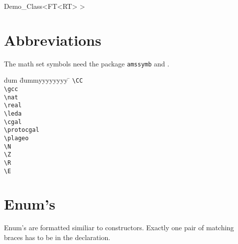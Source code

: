 \documentclass[12pt]{article}
\begin{document}
{\begin{ccClassTemplate}{Demo_Class<FT<RT> >}
\ccOperations
{}


\end{ccClassTemplate}

\section{Abbreviations}

The math set symbols need the package
{\tt amssymb} and \LaTeXe.

\begin{tabbing}
  dum \= dummyyyyyyyy \= \kill
  \> \verb+\CC+         \> \CC         \\
  \> \verb+\gcc+        \> \gcc        \\
  \> \verb+\nat+        \> \nat        \\
  \> \verb+\real+       \> \real       \\
  \> \verb+\leda+       \> \leda       \\
  \> \verb+\cgal+       \> \cgal       \\
  \> \verb+\protocgal+  \> \protocgal  \\
  \> \verb+\plageo+     \> \plageo     \\ 
  \> \verb+\+\verb+N+        \> \N        \\
  \> \verb+\+\verb+Z+        \> \Z        \\
  \> \verb+\+\verb+R+        \> \R        \\
  \> \verb+\+\verb+E+        \> \E
\end{tabbing}

\section{Enum's}

Enum's are formatted similiar to constructors. Exactly one pair of
matching braces has to be in the declaration.




}
\end{document}
